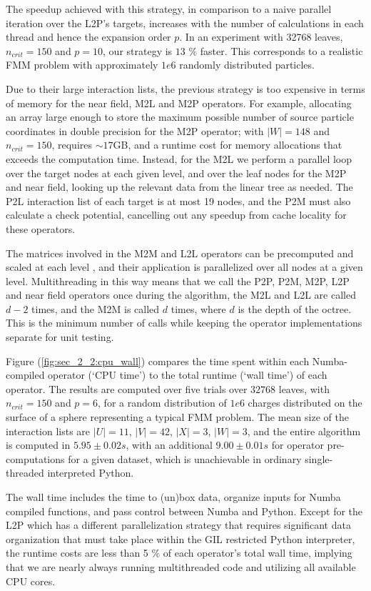 The speedup achieved with this strategy, in comparison to a naive parallel iteration over the L2P's targets, increases with the number of calculations in each thread and hence the expansion order $p$. In an experiment with 32768 leaves, $n_{crit} = 150$ and $p=10$, our strategy is $13$ \% faster. This corresponds to a realistic FMM problem with approximately $1e6$ randomly distributed particles.

Due to their large interaction lists, the previous strategy is too expensive in terms of memory for the near field, M2L and M2P operators. For example, allocating an array large enough to store the maximum possible number of source particle coordinates in double precision for the M2P operator; with $|W|=148$ and $n_{crit}=150$, requires $\sim 17$GB, and a runtime cost for memory allocations that exceeds the computation time. Instead, for the M2L we perform a parallel loop over the target nodes at each given level, and over the leaf nodes for the M2P and near field, looking up the relevant data from the linear tree as needed. The P2L interaction list of each target is at most 19 nodes, and the P2M must also calculate a check potential, cancelling out any speedup from cache locality for these operators.

The matrices involved in the M2M and L2L operators can be precomputed and scaled at each level \cite{wang2021exafmm}, and their application is parallelized over all nodes at a given level. Multithreading in this way means that we call the P2P, P2M, M2P, L2P and near field operators once during the algorithm, the M2L and L2L are called $d-2$ times, and the M2M is called $d$ times, where $d$ is the depth of the octree. This is the minimum number of calls while keeping the operator implementations separate for unit testing.

Figure (\ref{fig:sec_2_2:cpu_wall}) compares the time spent within each Numba-compiled operator (`CPU time') to the total runtime (`wall time') of each operator. The results are computed over five trials over $32768$ leaves, with $n_{crit}=150$ and $p=6$, for a random distribution of $1e6$ charges distributed on the surface of a sphere representing a typical FMM problem. The mean size of the interaction lists are $|U|=11$, $|V|=42$, $|X|=3$, $|W|=3$, and the entire algorithm is computed in $5.95 \pm 0.02 s$, with an additional $9.00 \pm 0.01 s$ for operator pre-computations for a given dataset, which is unachievable in ordinary single-threaded interpreted Python.

The wall time includes the time to (un)box data, organize inputs for Numba compiled functions, and pass control between Numba and Python. Except for the L2P which has a different parallelization strategy that requires significant data organization that must take place within the GIL restricted Python interpreter, the runtime costs are less than 5 \% of each operator's total wall time, implying that we are nearly always running multithreaded code and utilizing all available CPU cores. 

